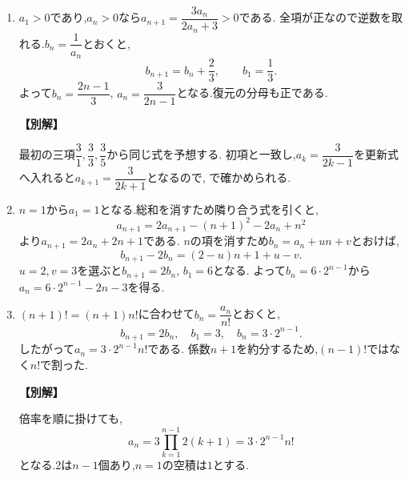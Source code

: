         \begin{enumerate}[label=\textbf{問\arabic*.},leftmargin=3.8em,format=\bookitemlink{practice-basic}{solution}{problem}]
          \item $a_1>0$であり,$a_n>0$なら$a_{n+1}=\dfrac{3a_n}{2a_n+3}>0$である.
                  全項が正なので逆数を取れる.$b_n=\dfrac{1}{a_n}$とおくと,
                  \[
                    b_{n+1}=b_n+\frac23,\qquad b_1=\frac13.
                  \]
                  よって$b_n=\dfrac{2n-1}{3}$, $a_n=\dfrac{3}{2n-1}$となる.復元の分母も正である.
                  \par\smallskip\noindent\textbf{【別解】}\par
                  最初の三項$\dfrac{3}{1},\dfrac{3}{3},\dfrac{3}{5}$から同じ式を予想する.
                  初項と一致し,$a_k=\dfrac{3}{2k-1}$を更新式へ入れると$a_{k+1}=\dfrac{3}{2k+1}$となるので,
                  で確かめられる.

          \item $n=1$から$a_1=1$となる.総和を消すため隣り合う式を引くと,
                  \[
                    a_{n+1}=2a_{n+1}-(n+1)^2-2a_n+n^2
                  \]
                  より$a_{n+1}=2a_n+2n+1$である.
                  $n$の項を消すため$b_n=a_n+un+v$とおけば,
                  \[
                    b_{n+1}-2b_n=(2-u)n+1+u-v.
                  \]
                  $u=2,v=3$を選ぶと$b_{n+1}=2b_n$, $b_1=6$となる.
                  よって$b_n=6\cdot2^{n-1}$から$a_n=6\cdot2^{n-1}-2n-3$を得る.

          \item $(n+1)!=(n+1)n!$に合わせて$b_n=\dfrac{a_n}{n!}$とおくと,
                  \[
                    b_{n+1}=2b_n,\quad b_1=3,\quad b_n=3\cdot2^{n-1}.
                  \]
                  したがって$a_n=3\cdot2^{n-1}n!$である.
                  係数$n+1$を約分するため,$(n-1)!$ではなく$n!$で割った.
                  \par\smallskip\noindent\textbf{【別解】}\par
                  倍率を順に掛けても,
                  \[
                    a_n=3\prod_{k=1}^{n-1}2(k+1)=3\cdot2^{n-1}n!
                  \]
                  となる.$2$は$n-1$個あり,$n=1$の空積は$1$とする.


\end{enumerate}

